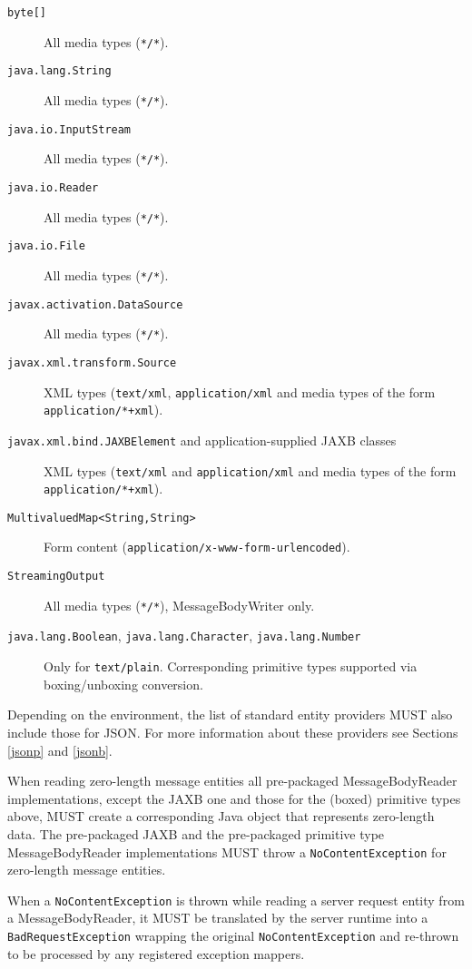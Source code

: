 \begin{description}
    \item[\lstinline{byte[]}] All media types (\lstinline{*/*}).
    \item[\lstinline{java.lang.String}] All media types (\lstinline{*/*}).
    \item[\lstinline{java.io.InputStream}] All media types (\lstinline{*/*}).
    \item[\lstinline{java.io.Reader}] All media types (\lstinline{*/*}).
    \item[\lstinline{java.io.File}] All media types (\lstinline{*/*}).
    \item[\lstinline{javax.activation.DataSource}] All media types (\lstinline{*/*}).
    \item[\lstinline{javax.xml.transform.Source}] XML types (\lstinline{text/xml}, \lstinline{application/xml} and media
    types of the form \lstinline{application/*+xml}).
    \item[\lstinline{javax.xml.bind.JAXBElement} and application-supplied JAXB classes] XML types (\lstinline{text/xml}
    and \lstinline{application/xml} and media
    types of the form \lstinline{application/*+xml}).
    \item[\lstinline{MultivaluedMap<String,String>}] Form content (\lstinline{application/x-www-form-urlencoded}).
    \item[\lstinline{StreamingOutput}] All media types (\lstinline{*/*}), MessageBodyWriter only.
    \item[\lstinline{java.lang.Boolean}, \lstinline{java.lang.Character}, \lstinline{java.lang.Number}
    \label{primitive_types}] Only for \lstinline{text/plain}. Corresponding primitive types supported via
    boxing/unboxing conversion.
\end{description}

Depending on the environment, the list of standard entity providers MUST also include those for JSON. For more
information about these providers see Sections \ref{jsonp} and \ref{jsonb}.

When reading zero-length message entities all pre-packaged MessageBodyReader implementations, except the JAXB one and
those for the (boxed) primitive types above, MUST create a corresponding Java object that represents zero-length data.
The pre-packaged JAXB and the pre-packaged primitive type MessageBodyReader implementations MUST throw a
\lstinline{NoContentException} for zero-length message entities.

When a \lstinline{NoContentException} is thrown while reading a server request entity from a MessageBodyReader, it MUST
be translated by the server runtime into a \lstinline{BadRequestException} wrapping the original
\lstinline{NoContentException} and re-thrown to be processed by any registered exception mappers.

